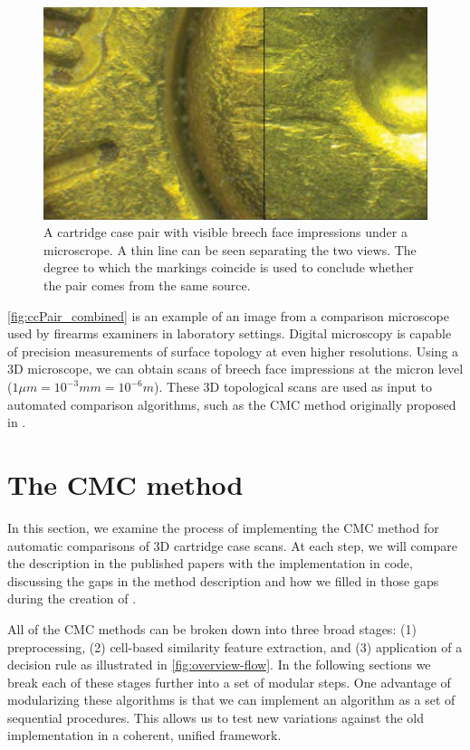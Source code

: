 \begin{Schunk}
\begin{figure}[htbp]
\includegraphics[width=\textwidth]{images/cartridgeCasePair_comparison_with_line} \caption{\label{fig:ccPair_combined} A cartridge case pair with visible breech face impressions under a microscrope.  A thin line can be seen separating the two views. The degree to which the markings coincide is used to conclude whether the pair comes from the same source.}\label{fig:unnamed-chunk-3}
\end{figure}
\end{Schunk}

\autoref{fig:ccPair_combined} is an example of an image from a
comparison microscope used by firearms examiners in laboratory settings.
Digital microscopy is capable of precision measurements of surface
topology at even higher resolutions. Using a 3D microscope, we can
obtain scans of breech face impressions at the micron level
(\(1 \mu m = 10^{-3} mm = 10^{-6} m\)). These 3D topological scans are
used as input to automated comparison algorithms, such as the CMC method
originally proposed in \citet{song_proposed_2013}.

\hypertarget{cmcMethod}{%
\section{The CMC method}\label{cmcMethod}}

In this section, we examine the process of implementing the CMC method
for automatic comparisons of 3D cartridge case scans. At each step, we
will compare the description in the published papers with the
implementation in code, discussing the gaps in the method description
and how we filled in those gaps during the creation of .

All of the CMC methods can be broken down into three broad stages: (1)
preprocessing, (2) cell-based similarity feature extraction, and (3)
application of a decision rule as illustrated in
\autoref{fig:overview-flow}. In the following sections we break each of
these stages further into a set of modular steps. One advantage of
modularizing these algorithms is that we can implement an algorithm as a
set of sequential procedures. This allows us to test new variations
against the old implementation in a coherent, unified framework.

